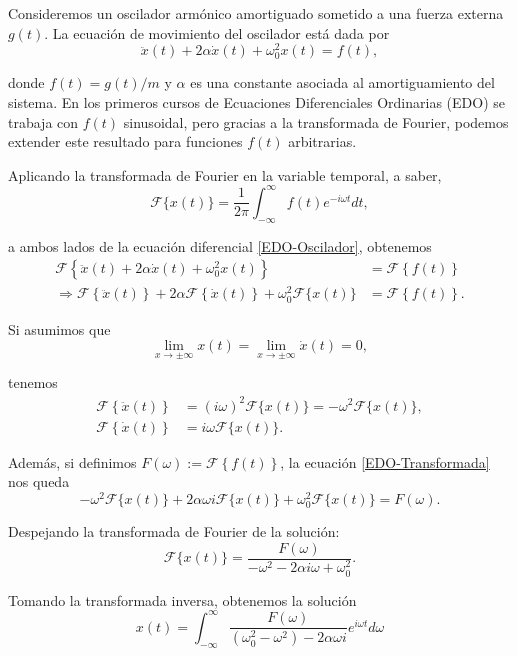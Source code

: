 \begin{ejemplo}
  Consideremos un oscilador armónico amortiguado sometido a una fuerza externa $g(t)$. La ecuación de movimiento del oscilador está dada por
\begin{equation}
 \ddot{x}(t) + 2 \alpha \dot{x}(t) + \omega_0^2 x(t) = f(t), \label{EDO-Oscilador}   
\end{equation}

donde $f(t) = g(t)/m$ y $\alpha$ es una constante asociada al amortiguamiento del sistema. En los primeros cursos de Ecuaciones Diferenciales Ordinarias (EDO) se trabaja con $f(t)$ sinusoidal, pero gracias a la transformada de Fourier, podemos extender este resultado para funciones $f(t)$ arbitrarias. 

Aplicando la transformada de Fourier en la variable temporal, a saber,
$$\mathcal{F}\{x(t)\} = \frac{1}{2\pi} \int_{-\infty}^{\infty} f(t) e^{-i\omega t} dt, $$

a ambos lados de la ecuación diferencial \eqref{EDO-Oscilador}, obtenemos 
\begin{align}
    \mathcal{F}\left\{ \ddot{x}(t) + 2 \alpha \dot{x}(t) + \omega_0^2 x(t)\right\} &= \mathcal{F}\left\{ f(t)\right\} \nonumber\\
    \Rightarrow   \mathcal{F}\left\{ \ddot{x}(t) \right\} + 2\alpha \mathcal{F}\left\{ \dot{x}(t) \right\} + \omega_0^2 \mathcal{F}\{x(t)\} &= \mathcal{F}\left\{ f(t)\right\}. \label{EDO-Transformada}
\end{align}

Si asumimos que 
$$\lim_{x \to \pm \infty} x(t) = \lim_{x \to \pm \infty} \dot{x}(t) = 0,$$

tenemos 
\begin{align*}
     \mathcal{F}\left\{ \ddot{x}(t) \right\} &= (i\omega)^2 \mathcal{F}\{x(t)\} = - \omega^2 \mathcal{F}\{x(t)\},\\
      \mathcal{F}\left\{ \dot{x}(t) \right\} &= i \omega \mathcal{F}\{x(t)\}.
\end{align*}

Además, si definimos $F(\omega) := \mathcal{F}\left\{ f(t)\right\}$, la ecuación \eqref{EDO-Transformada} nos queda
$$ - \omega^2 \mathcal{F}\{x(t)\} + 2 \alpha \omega i \mathcal{F}\{x(t)\} + \omega_0^2 \mathcal{F}\{x(t)\} = F(\omega).$$

Despejando la transformada de Fourier de la solución:
$$  \mathcal{F}\{x(t)\} = \frac{F(\omega)}{-\omega^2 - 2 \alpha i \omega + \omega_0^2}.$$

Tomando la transformada inversa, obtenemos la solución 
$$\boxed{x(t) = \int_{-\infty}^{\infty} \frac{F(\omega)}{(\omega_0^2-\omega^2) - 2 \alpha \omega i} e^{i\omega t} d\omega }$$  
\end{ejemplo}
